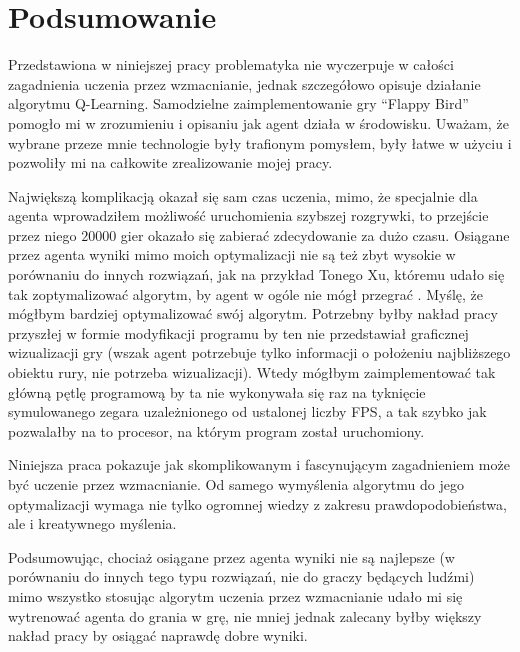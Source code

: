 \documentclass[a4paper, 12pt,twoside]{report}
\newcommand\chap[1]{%
  \chapter*{#1}%
  \addcontentsline{toc}{chapter}{#1}}
\begin{document}
\chap{Podsumowanie}
Przedstawiona w niniejszej pracy problematyka nie wyczerpuje w całości
zagadnienia uczenia przez wzmacnianie, jednak szczegółowo opisuje działanie
algorytmu Q-Learning. Samodzielne zaimplementowanie gry ``Flappy Bird'' pomogło
mi w zrozumieniu i opisaniu jak agent działa w środowisku. Uważam, że wybrane
przeze mnie technologie były trafionym pomysłem, były łatwe w użyciu i
pozwoliły mi na całkowite zrealizowanie mojej pracy.

Największą komplikacją okazał się sam czas uczenia, mimo, że specjalnie dla 
agenta wprowadziłem możliwość uruchomienia szybszej rozgrywki, to przejście
przez niego $20000$ gier okazało się zabierać zdecydowanie za dużo czasu.
Osiągane przez agenta wyniki mimo moich optymalizacji nie są też zbyt wysokie w
porównaniu do innych rozwiązań, jak na przykład Tonego Xu, któremu udało się
tak zoptymalizować algorytm, by agent w ogóle nie mógł
przegrać \cite{tds_rl_score}. Myślę, że mógłbym bardziej optymalizować swój
algorytm. Potrzebny byłby nakład pracy przyszłej w formie modyfikacji programu
by ten nie przedstawiał graficznej wizualizacji gry (wszak agent potrzebuje
tylko informacji o położeniu najbliższego obiektu rury, nie potrzeba
wizualizacji). Wtedy mógłbym zaimplementować tak główną pętlę programową by ta
nie wykonywała się raz na tyknięcie symulowanego zegara uzależnionego od
ustalonej liczby FPS, a tak szybko jak pozwalałby na to procesor, na którym
program został uruchomiony.
	
Niniejsza praca pokazuje jak skomplikowanym i fascynującym zagadnieniem może
być uczenie przez wzmacnianie. Od samego wymyślenia algorytmu do jego
optymalizacji wymaga nie tylko ogromnej wiedzy z zakresu prawdopodobieństwa,
ale i kreatywnego myślenia.

Podsumowując, chociaż osiągane przez agenta wyniki nie są najlepsze (w
porównaniu do innych tego typu rozwiązań, nie do graczy będących ludźmi)
mimo wszystko stosując algorytm uczenia przez wzmacnianie udało mi się
wytrenować agenta do grania w grę, nie mniej jednak zalecany byłby większy
nakład pracy by osiągać naprawdę dobre wyniki.



\end{document}
